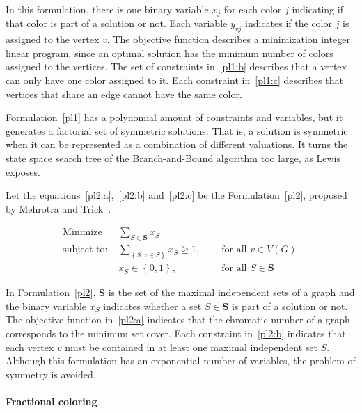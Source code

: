 \documentclass[fleqn,10pt]{SelfArx} %
\newcommand{\chaves}[1] {\ensuremath{{\left \{ {#1} \right \}}}}
\begin{document}
	In this formulation, there is one binary variable $x_j$ for each color
	$j$ indicating if that color is part of a solution or not. Each
	variable $y_{vj}$ indicates if the color $j$ is assigned to the vertex
	$v$. The objective function describes a minimization integer linear
	program, since an optimal solution has the minimum number of colors assigned to the vertices. The set of constraints in~\eqref{pl1:b} describes that
	a vertex can only have one color assigned to it. Each constraint in~\eqref{pl1:c} describes that vertices that share an edge cannot have the
	same color.
	
	Formulation~\eqref{pl1} has a polynomial amount of constraints and variables,
	but it generates a factorial set of symmetric solutions. That is, a solution is symmetric when it can be represented as a combination of different
	valuations. It turns the state space search tree of the Branch-and-Bound algorithm
	too large, as Lewis~\cite{Lewis2015} exposes. 
	
	Let the equations~\eqref{pl2:a},~\eqref{pl2:b} and~\eqref{pl2:c} be the Formulation~\eqref{pl2}, proposed by Mehrotra and Trick~\cite{Mehrotra95}.
	
	\begin{subequations}\label{pl2}
		\begin{align}
		\text{Minimize } & \displaystyle\sum_{S \in \boldsymbol{S}} x_S & \label{pl2:a}\ \\
		\text{subject to: } & \displaystyle\sum_{\chaves{S:v \in S}} x_S \geq 1, &&\text{ for all } v \in V(G) \label{pl2:b}\ \\
		& x_S \in \chaves{0,1}, && \text{ for all } S \in \textbf{S} \label{pl2:c}\
		\end{align}
	\end{subequations}
	
	In Formulation~\eqref{pl2}, \textbf{S} is the set of the maximal independent
	sets of a graph and the binary variable $x_S$ indicates whether a set
	$S \in \textbf{S}$ is part of a solution or not. The objective function
	in~\eqref{pl2:a} indicates that the chromatic number of a graph
	corresponds to the minimum set cover. Each constraint in~\eqref{pl2:b}
	indicates that each vertex $v$ must be contained in at least one
	maximal independent set $S$. Although this formulation has an
	exponential number of variables, the problem of symmetry is avoided.
	
	\paragraph{Fractional coloring}
	
\end{document}

